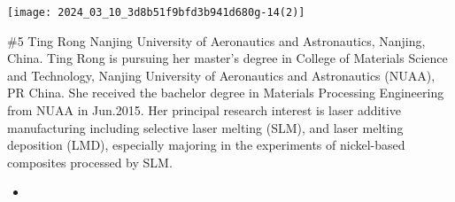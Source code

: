 \documentclass[10pt]{article}
\begin{document}
\begin{center}
\texttt{[image: 2024\_03\_10\_3d8b51f9bfd3b941d680g-14(2)]}
\end{center}

\#5 Ting Rong Nanjing University of Aeronautics and Astronautics, Nanjing, China. Ting Rong is pursuing her master's degree in College of Materials Science and Technology, Nanjing University of Aeronautics and Astronautics (NUAA), PR China. She received the bachelor degree in Materials Processing Engineering from NUAA in Jun.2015. Her principal research interest is laser additive manufacturing including selective laser melting (SLM), and laser melting deposition (LMD), especially majoring in the experiments of nickel-based composites processed by SLM.

\begin{itemize}
  \item 
\end{itemize}
\end{document}

